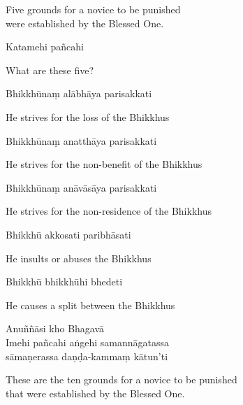 \begin{english}
  Five grounds for a novice to be punished\\
  were established by the Blessed One.
\end{english}

Katamehi pañcahi

\begin{english}
  What are these five?
\end{english}

Bhikkhūnaṃ alābhāya parisakkati

\begin{english}
  He strives for the loss of the Bhikkhus
\end{english}

Bhikkhūnaṃ anatthāya parisakkati

\begin{english}
  He strives for the non-benefit of the Bhikkhus
\end{english}

Bhikkhūnaṃ anāvāsāya parisakkati

\begin{english}
  He strives for the non-residence of the Bhikkhus
\end{english}

Bhikkhū akkosati paribhāsati

\begin{english}
  He insults or abuses the Bhikkhus
\end{english}

Bhikkhū bhikkhūhi bhedeti

\begin{english}
  He causes a split between the Bhikkhus
\end{english}

Anuññāsi kho Bhagavā\\
Imehi pañcahi aṅgehi samannāgatassa\\
sāmaṇerassa daṇḍa-kammaṃ kātun'ti

\begin{english}
  These are the ten grounds for a novice to be punished\\
  that were established by the Blessed One.
\end{english}


